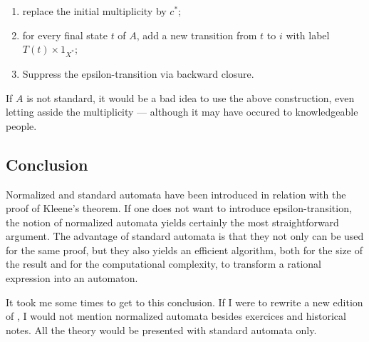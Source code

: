 \begin{enumerate}
\item replace the initial multiplicity by $c^*$;

\item for every final state $t$ of $A$, add a new transition from $t$
  to $i$ with label $T(t) \times 1_{X^*}$;

\item Suppress the epsilon-transition via backward closure.
\end{enumerate}
\begin{remark}
  If $A$ is not standard, it would be a bad idea to use the above
  construction, even letting asside the multiplicity --- although it
  may have occured to knowledgeable people.
\end{remark}

\subsection{Conclusion}

Normalized and standard automata have been introduced in relation with
the proof of Kleene's theorem. If one does not want to introduce
epsilon-transition, the notion of normalized automata yields certainly
the most straightforward argument. The advantage of standard automata
is that they not only can be used for the same proof, but they also
yields an efficient algorithm, both for the size of the result and for
the computational complexity, to transform a rational expression into
an automaton.

It took me some times to get to this conclusion. If I were to rewrite
a new edition of \cite{sakarovitch.03.eta}, I would not mention
normalized automata besides exercices and historical notes. All the
theory would be presented with standard automata only.

